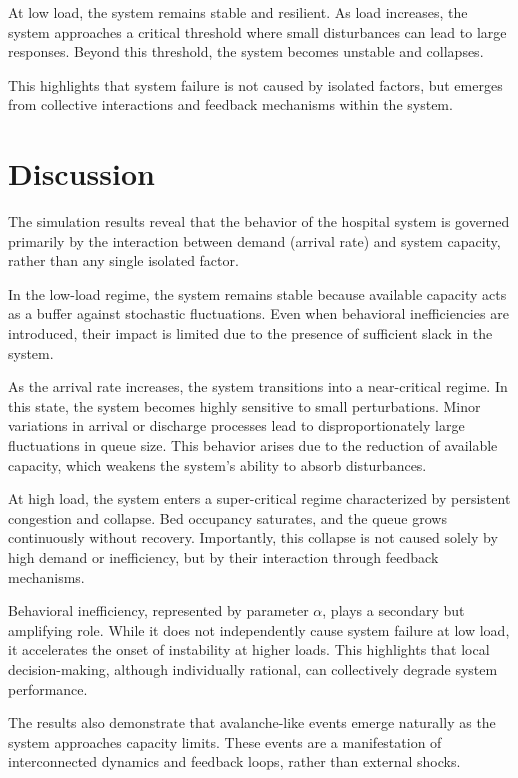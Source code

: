 \documentclass[11pt]{article}
\begin{document}
At low load, the system remains stable and resilient. As load increases, the system approaches a critical threshold where small disturbances can lead to large responses. Beyond this threshold, the system becomes unstable and collapses.

This highlights that system failure is not caused by isolated factors, but emerges from collective interactions and feedback mechanisms within the system.
\section{Discussion}

The simulation results reveal that the behavior of the hospital system is governed primarily by the interaction between demand (arrival rate) and system capacity, rather than any single isolated factor.

In the low-load regime, the system remains stable because available capacity acts as a buffer against stochastic fluctuations. Even when behavioral inefficiencies are introduced, their impact is limited due to the presence of sufficient slack in the system.

As the arrival rate increases, the system transitions into a near-critical regime. In this state, the system becomes highly sensitive to small perturbations. Minor variations in arrival or discharge processes lead to disproportionately large fluctuations in queue size. This behavior arises due to the reduction of available capacity, which weakens the system's ability to absorb disturbances.

At high load, the system enters a super-critical regime characterized by persistent congestion and collapse. Bed occupancy saturates, and the queue grows continuously without recovery. Importantly, this collapse is not caused solely by high demand or inefficiency, but by their interaction through feedback mechanisms.

Behavioral inefficiency, represented by parameter $\alpha$, plays a secondary but amplifying role. While it does not independently cause system failure at low load, it accelerates the onset of instability at higher loads. This highlights that local decision-making, although individually rational, can collectively degrade system performance.

The results also demonstrate that avalanche-like events emerge naturally as the system approaches capacity limits. These events are a manifestation of interconnected dynamics and feedback loops, rather than external shocks.
\end{document}
